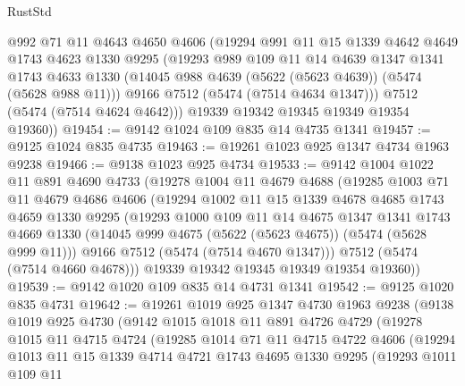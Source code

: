 \begin{lexlean}{RustStd}
\begin{coremodule}
        @992
        @71
        @11
        @4643
        @4650
        @4606
        (@19294
          @991
          @11
          @15
          @1339
          @4642
          @4649
          @1743
          @4623
          @1330
          @9295
          (@19293
            @989
            @109
            @11
            @14
            @4639
            @1347
            @1341
            @1743
            @4633
            @1330
            (@14045 @988 @4639 (@5622 (@5623 @4639)) (@5474 (@5628 @988 @11)))
            @9166
            @7512
            (@5474 (@7514 @4634 @1347)))
          @7512
          (@5474 (@7514 @4624 @4642)))
        @19339
        @19342
        @19345
        @19349
        @19354
        @19360))
@19454 := @9142 @1024 @109 @835 @14 @4735 @1341
@19457 := @9125 @1024 @835 @4735
@19463 := @19261 @1023 @925 @1347 @4734 @1963 @9238
@19466 := @9138 @1023 @925 @4734
@19533 := @9142
    @1004
    @1022
    @11
    @891
    @4690
    @4733
    (@19278
      @1004
      @11
      @4679
      @4688
      (@19285
        @1003
        @71
        @11
        @4679
        @4686
        @4606
        (@19294
          @1002
          @11
          @15
          @1339
          @4678
          @4685
          @1743
          @4659
          @1330
          @9295
          (@19293
            @1000
            @109
            @11
            @14
            @4675
            @1347
            @1341
            @1743
            @4669
            @1330
            (@14045 @999 @4675 (@5622 (@5623 @4675)) (@5474 (@5628 @999 @11)))
            @9166
            @7512
            (@5474 (@7514 @4670 @1347)))
          @7512
          (@5474 (@7514 @4660 @4678)))
        @19339
        @19342
        @19345
        @19349
        @19354
        @19360))
@19539 := @9142 @1020 @109 @835 @14 @4731 @1341
@19542 := @9125 @1020 @835 @4731
@19642 := @19261
    @1019
    @925
    @1347
    @4730
    @1963
    @9238
    (@9138
      @1019
      @925
      @4730
      (@9142
        @1015
        @1018
        @11
        @891
        @4726
        @4729
        (@19278
          @1015
          @11
          @4715
          @4724
          (@19285
            @1014
            @71
            @11
            @4715
            @4722
            @4606
            (@19294
              @1013
              @11
              @15
              @1339
              @4714
              @4721
              @1743
              @4695
              @1330
              @9295
              (@19293
                @1011
                @109
                @11

\end{coremodule}
\end{lexlean}
